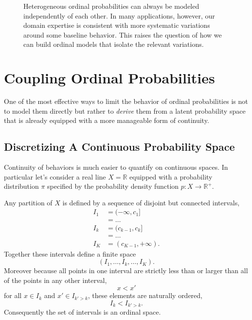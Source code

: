 \documentclass[
  letterpaper,
  DIV=11,
  numbers=noendperiod]{scrartcl}
\begin{document}
\begin{figure}


\caption{\label{fig-perturbed-probs}Heterogeneous ordinal probabilities
can always be modeled independently of each other. In many applications,
however, our domain expertise is consistent with more systematic
variations around some baseline behavior. This raises the question of
how we can build ordinal models that isolate the relevant variations.}

\end{figure}%

\section{Coupling Ordinal
Probabilities}\label{coupling-ordinal-probabilities}

One of the most effective ways to limit the behavior of ordinal
probabilities is not to model them directly but rather to \emph{derive}
them from a latent probability space that is already equipped with a
more manageable form of continuity.

\subsection{Discretizing A Continuous Probability
Space}\label{derived-probs}

Continuity of behaviors is much easier to quantify on continuous spaces.
In particular let's consider a real line \(X = \mathbb{R}\) equipped
with a probability distribution \(\pi\) specified by the probability
density function \(p : X \rightarrow \mathbb{R}^{+}\).

Any partition of \(X\) is defined by a sequence of disjoint but
connected intervals, \begin{align*}
I_{1} &= (-\infty, c_{1} ]
\\
&= \ldots
\\
I_{k} &= ( c_{k - 1}, c_{k} ]
\\
&= \ldots
\\
I_{K} &= ( c_{K - 1}, +\infty ).
\end{align*} Together these intervals define a finite space \[
( I_{1}, \ldots, I_{k}, \ldots, I_{K} ).
\] Moreover because all points in one interval are strictly less than or
larger than all of the points in any other interval, \[
x < x'
\] for all \(x \in I_{k}\) and \(x' \in I_{k' > k}\), these elements are
naturally ordered, \[
I_{k} < I_{k' > k}.
\] Consequently the set of intervals is an ordinal space.
\end{document}
